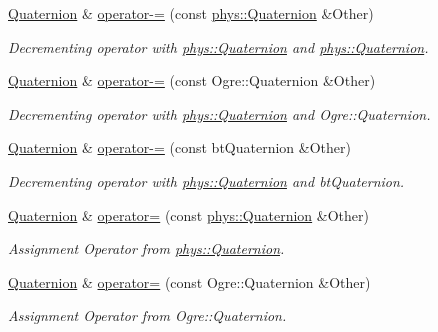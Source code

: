 \begin{DoxyCompactItemize}
\hyperlink{classphys_1_1Quaternion}{Quaternion} \& \hyperlink{classphys_1_1Quaternion_a66086148dd9154e3e3e0b46bacafe0f7}{operator-\/=} (const \hyperlink{classphys_1_1Quaternion}{phys::Quaternion} \&Other)
\begin{DoxyCompactList}\small\item\em Decrementing operator with \hyperlink{classphys_1_1Quaternion}{phys::Quaternion} and \hyperlink{classphys_1_1Quaternion}{phys::Quaternion}. \item\end{DoxyCompactList}\item 
\hyperlink{classphys_1_1Quaternion}{Quaternion} \& \hyperlink{classphys_1_1Quaternion_af62037687eea0005c9fc4a09355656ed}{operator-\/=} (const Ogre::Quaternion \&Other)
\begin{DoxyCompactList}\small\item\em Decrementing operator with \hyperlink{classphys_1_1Quaternion}{phys::Quaternion} and Ogre::Quaternion. \item\end{DoxyCompactList}\item 
\hyperlink{classphys_1_1Quaternion}{Quaternion} \& \hyperlink{classphys_1_1Quaternion_abd1e9d740b3af194c60466105d07f6ff}{operator-\/=} (const btQuaternion \&Other)
\begin{DoxyCompactList}\small\item\em Decrementing operator with \hyperlink{classphys_1_1Quaternion}{phys::Quaternion} and btQuaternion. \item\end{DoxyCompactList}\item 
\hyperlink{classphys_1_1Quaternion}{Quaternion} \& \hyperlink{classphys_1_1Quaternion_a6213bddf8f928a8510260b9deb712fd7}{operator=} (const \hyperlink{classphys_1_1Quaternion}{phys::Quaternion} \&Other)
\begin{DoxyCompactList}\small\item\em Assignment Operator from \hyperlink{classphys_1_1Quaternion}{phys::Quaternion}. \item\end{DoxyCompactList}\item 
\hyperlink{classphys_1_1Quaternion}{Quaternion} \& \hyperlink{classphys_1_1Quaternion_a6b9fe92548e3fd114d7419ddd5d5a660}{operator=} (const Ogre::Quaternion \&Other)
\begin{DoxyCompactList}\small\item\em Assignment Operator from Ogre::Quaternion. \item\end{DoxyCompactList}\item 

\end{DoxyCompactItemize}
